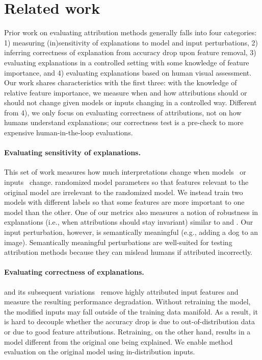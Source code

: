 \documentclass[twoside]{article}
\begin{document}
\section{Related work}
Prior work on evaluating attribution methods generally falls into four categories: 1) measuring (in)sensitivity of explanations to model and input perturbations, 2) inferring correctness of explanation from accuracy drop upon feature removal, 3) evaluating explanations in a controlled setting with some knowledge of feature importance, and 4) evaluating explanations based on human visual assessment. Our work shares characteristics with the first three: with the knowledge of relative feature importance, we measure when and how attributions should or should not change given models or inputs changing in a controlled way. Different from 4), we only focus on evaluating correctness of attributions, not on how humans understand explanations; our correctness test is a pre-check to more expensive human-in-the-loop evaluations.

\paragraph{Evaluating sensitivity of explanations.} This set of work measures how much interpretations change when models~\citep{Heo19, Adebayo18} or inputs~\citep{Ghorbani18, Alvarez18} change. \citet{Adebayo18} randomized model parameters so that features relevant to the original model are irrelevant to the randomized model. We instead train two models with different labels so that some features are more important to one model than the other. One of our metrics also measures a notion of robustness in explanations (i.e., when attributions should stay invariant) similar to \citet{Alvarez18} and \citet{Ghorbani18}. Our input perturbation, however, is semantically meaningful (e.g., adding a dog to an image). Semantically meaningful perturbations are well-suited for testing attribution methods because they can mislead humans if attributed incorrectly.

\paragraph{Evaluating correctness of explanations.} \citet{Samek17} and its subsequent variations~\citep{Fong17, Ancona18, Hooker18} remove highly attributed input features and measure the resulting performance degradation. Without retraining the model, the modified inputs may fall outside of the training data manifold. As a result, it is hard to decouple whether the accuracy drop is due to out-of-distribution data or due to good feature attributions. Retraining, on the other hand, results in a model different from the original one being explained. We enable method evaluation on the original model using in-distribution inputs.
\end{document}
